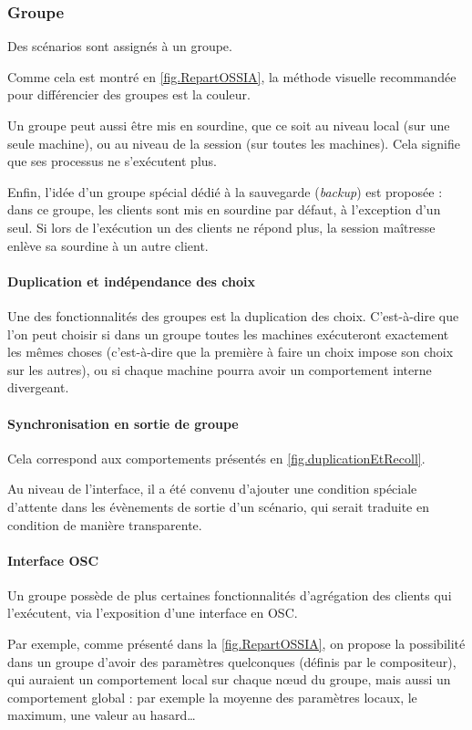\subsubsection{Groupe}
Des scénarios sont assignés à un groupe.

Comme cela est montré en \cref{fig.RepartOSSIA}, la méthode visuelle recommandée pour différencier des groupes est la couleur.

Un groupe peut aussi être mis en sourdine, que ce soit au niveau local (sur une seule machine), ou au niveau de la session (sur toutes les machines). Cela signifie que ses processus ne s'exécutent plus. 

Enfin, l'idée d'un groupe spécial dédié à la sauvegarde (\textit{backup}) est proposée : dans ce groupe, les clients sont mis en sourdine par défaut, à l'exception d'un seul. Si lors de l'exécution un des clients ne répond plus, la session maîtresse enlève sa sourdine à un autre client.

\paragraph{Duplication et indépendance des choix}
Une des fonctionnalités des groupes est la duplication des choix. C'est-à-dire que l'on peut choisir si dans un groupe toutes les machines exécuteront exactement les mêmes choses (c'est-à-dire que la première à faire un choix impose son choix sur les autres), ou si chaque machine pourra avoir un comportement interne divergeant.

\paragraph{Synchronisation en sortie de groupe}
Cela correspond aux comportements présentés en \cref{fig.duplicationEtRecoll}.

Au niveau de l'interface, il a été convenu d'ajouter une condition spéciale d'attente dans les évènements de sortie d'un scénario, qui serait traduite en condition  de manière transparente.

\paragraph{Interface OSC}
Un groupe possède de plus certaines fonctionnalités d'agrégation des clients qui l'exécutent, via l'exposition d'une interface en \ac{OSC}.

Par exemple, comme présenté dans la \cref{fig.RepartOSSIA}, on propose la possibilité dans un groupe d'avoir des paramètres quelconques (définis par le compositeur), qui auraient un comportement local sur chaque nœud du groupe, mais aussi un comportement global : par exemple la moyenne des paramètres locaux, le maximum, une valeur au hasard\dots

